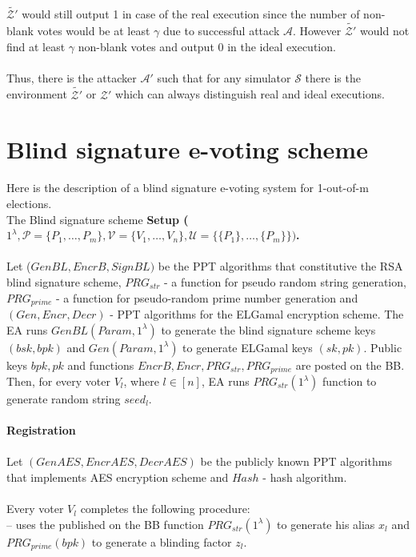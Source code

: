 \documentclass[12pt]{article}
\begin{document}
$\tilde{\mathcal{Z'}}$ would still output 1 in case of the real execution since the number of non-blank votes would be at least $\gamma$ due to successful attack  $\mathcal{A}$. However  $\tilde{\mathcal{Z'}}$ would not find at least $\gamma$ non-blank votes and output 0 in the ideal execution. \\\\
Thus, there is the attacker $\mathcal{A'}$ such that for any simulator $\mathcal{S}$ there is the environment $\tilde{\mathcal{Z'}}$ or $\mathcal{Z'}$ which can always distinguish real and ideal executions. 
%
%
\section {Blind signature e-voting scheme}
Here is the description of a blind signature e-voting system for 1-out-of-m elections.\\
The Blind signature scheme 
\textbf{Setup ($1^{\lambda}, \mathcal{P} = \{P_1,\dots,P_m\}, \mathcal{V} = \{V_1,\dots,V_n\}, \mathcal{U} =  \{\{P_1\},\dots,\{P_m\}\})$.}\\\\
Let ($GenBL, EncrB, SignBL)$ be the PPT algorithms that constitutive the RSA blind signature scheme,  $PRG_{str}$  - a function for pseudo random string generation, $PRG_{prime}$  - a function for pseudo-random prime number generation and $(Gen, Encr, Decr)$ - PPT algorithms for the ELGamal encryption scheme. The EA runs $GenBL(Param, 1^{\lambda})$ to generate the blind signature scheme keys $(bsk, bpk)$ and $Gen(Param, 1^{\lambda})$ to generate ELGamal keys $(sk,pk)$. Public keys $bpk,pk$ and functions $EncrB,Encr, PRG_{str}, PRG_{prime}$ are posted on the BB.\\
Then, for every voter $V_l$, where $l \in [n]$, EA runs $PRG_{str}(1^{\lambda})$ function to generate random string $seed_l$.\\\\
\textbf{Registration}\\\\
Let $(GenAES, EncrAES, DecrAES)$ be the publicly known PPT algorithms that implements AES encryption scheme and $Hash$ - hash algorithm.  \\\\
Every voter $V_l$ completes the following procedure: \\
--  uses the published on the BB function $PRG_{str}(1^{\lambda})$ to generate his alias $x_l$ and  $PRG_{prime}(bpk)$ to generate a blinding factor $z_l$. \\
\end{document}
